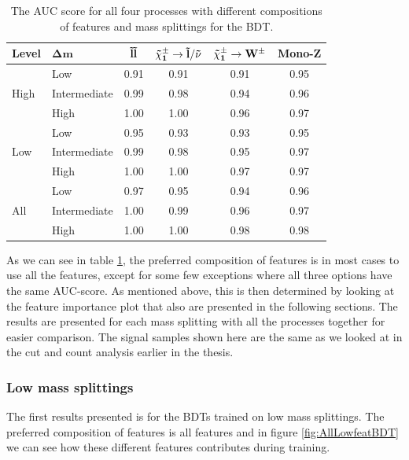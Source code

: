 \begin{table}[H]
    \centering
    \renewcommand{\arraystretch}{1.}
    \begin{tabular}{l l c c c c }
    \toprule
    \textbf{Level} & $\mathbf{\Delta m}$ & $\mathbf{\Tilde{l} \Tilde{l}}$ & $\mathbf{\Tilde{\chi}_1^\pm \rightarrow \Tilde{l}/\Tilde{\nu}}$ & $\mathbf{\Tilde{\chi}_1^\pm \rightarrow W^\pm}$ & \textbf{Mono-Z}  \\
    \midrule
    \midrule
    \multirow{3}{*}{High} &  Low   & 0.91 & 0.91 & 0.91 & 0.95 \\
     & Intermediate & 0.99 & 0.98 & 0.94 & 0.96 \\
     & High & 1.00 & 1.00 & 0.96 & 0.97 \\
     \midrule
    \multirow{3}{*}{Low} & Low & 0.95 & 0.93 & 0.93 & 0.95 \\
     & Intermediate & 0.99 & 0.98 & 0.95 & 0.97 \\
     & High & 1.00 & 1.00 & 0.97 & 0.97 \\
     \midrule
    \multirow{3}{*}{All} & Low & 0.97 & 0.95 & 0.94 & 0.96 \\
     & Intermediate & 1.00 & 0.99 & 0.96 & 0.97 \\
     & High & 1.00 & 1.00 & 0.98 & 0.98 \\
     \bottomrule
    \end{tabular}
    \caption{The AUC score for all four processes with different compositions of features and mass splittings for the BDT.}
    \label{tab:AUCBDT}
\end{table}


As we can see in table \ref{tab:AUCBDT}, the preferred composition of features is in most cases to use all the features, except for some few exceptions where all three options have the same AUC-score. As mentioned above, this is then determined by looking at the feature importance plot that also are presented in the following sections. The results are presented for each mass splitting with all the processes together for easier comparison. The signal samples shown here are the same as we looked at in the cut and count analysis earlier in the thesis.
















\subsubsection{Low mass splittings}
The first results presented is for the BDTs trained on low mass splittings. The preferred composition of features is all features and in figure \ref{fig:AllLowfeatBDT} we can see how these different features contributes during training. 


